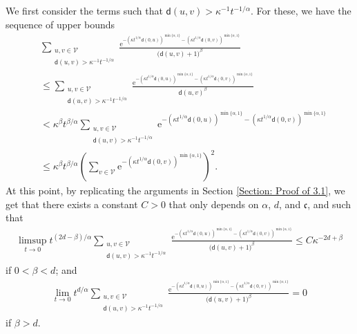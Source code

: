 \documentclass{amsart}
\numberwithin{equation}{section}
\theoremstyle{definition}
\newcommand\al{\alpha}
\newcommand\be{\beta}
\newcommand\ka{\kappa}
\newcommand\mf{\mathfrak}
\newcommand\mr{\mathrm}
\newcommand\ms{\mathscr}
\newcommand\msf{\mathsf}
\begin{document}
%

We first consider the terms such that $\msf d(u,v)>\ka^{-1}t^{-1/\al}$. For these, we have the sequence of upper bounds
\begin{align*}
&\sum_{\substack{u,v\in\ms V\\\msf d(u,v)>\ka^{-1}t^{-1/\al}}}\frac{\mr e^{-(\ka t^{1/\al}\msf d(0,u))^{\min\{\al,1\}}-(\ka t^{1/\al}\msf d(0,v))^{\min\{\al,1\}}}}{
\big(\msf d(u,v)+1\big)^{\be}}\\
&\leq\sum_{\substack{u,v\in\ms V\\\msf d(u,v)>\ka^{-1}t^{-1/\al}}}\frac{\mr e^{-(\ka t^{1/\al}\msf d(0,u))^{\min\{\al,1\}}-(\ka t^{1/\al}\msf d(0,v))^{\min\{\al,1\}}}}{
\msf d(u,v)^{\be}}\\
&<\ka^\be t^{\be/\al}\sum_{\substack{u,v\in\ms V\\\msf d(u,v)>\ka^{-1}t^{-1/\al}}}\mr e^{-(\ka t^{1/\al}\msf d(0,u))^{\min\{\al,1\}}-(\ka t^{1/\al}\msf d(0,v))^{\min\{\al,1\}}}\\
&\leq\ka^\be t^{\be/\al}\left(\sum_{v\in\ms V}\mr e^{-(\ka t^{1/\al}\msf d(0,v))^{\min\{\al,1\}}}\right)^2.
\end{align*}
At this point, by replicating the arguments in Section \ref{Section: Proof of 3.1}, we get that there exists
a constant $C>0$ that only depends on $\al$, $d$, and $\mf c$, and such that
\begin{align}
\label{Equation: 3.2 Proof 1}
\limsup_{t\to0}t^{(2d-\be)/\al}\sum_{\substack{u,v\in\ms V\\\msf d(u,v)>\ka^{-1}t^{-1/\al}}}\frac{\mr e^{-(\ka t^{1/\al}\msf d(0,u))^{\min\{\al,1\}}-(\ka t^{1/\al}\msf d(0,v))^{\min\{\al,1\}}}}{
\big(\msf d(u,v)+1\big)^{\be}}\leq C\ka^{-2d+\be}
\end{align}
if $0<\be<d$; and
\begin{align}
\label{Equation: 3.3 Proof 1}
\lim_{t\to0}t^{d/\al}\sum_{\substack{u,v\in\ms V\\\msf d(u,v)>\ka^{-1}t^{-1/\al}}}\frac{\mr e^{-(\ka t^{1/\al}\msf d(0,u))^{\min\{\al,1\}}-(\ka t^{1/\al}\msf d(0,v))^{\min\{\al,1\}}}}{
\big(\msf d(u,v)+1\big)^{\be}}=0
\end{align}
if $\be>d$.

%
\end{document}
